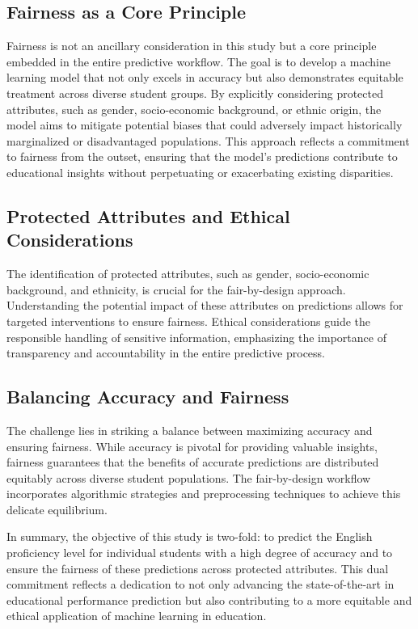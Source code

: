 \subsection{Fairness as a Core Principle}

Fairness is not an ancillary consideration in this study but a core principle embedded in the entire predictive workflow. The goal is to develop a machine learning model that not only excels in accuracy but also demonstrates equitable treatment across diverse student groups. By explicitly considering protected attributes, such as gender, socio-economic background, or ethnic origin, the model aims to mitigate potential biases that could adversely impact historically marginalized or disadvantaged populations. This approach reflects a commitment to fairness from the outset, ensuring that the model's predictions contribute to educational insights without perpetuating or exacerbating existing disparities.

\subsection{Protected Attributes and Ethical Considerations}

The identification of protected attributes, such as gender, socio-economic background, and ethnicity, is crucial for the fair-by-design approach. Understanding the potential impact of these attributes on predictions allows for targeted interventions to ensure fairness. Ethical considerations guide the responsible handling of sensitive information, emphasizing the importance of transparency and accountability in the entire predictive process.

\subsection{Balancing Accuracy and Fairness}

The challenge lies in striking a balance between maximizing accuracy and ensuring fairness. While accuracy is pivotal for providing valuable insights, fairness guarantees that the benefits of accurate predictions are distributed equitably across diverse student populations. The fair-by-design workflow incorporates algorithmic strategies and preprocessing techniques to achieve this delicate equilibrium.

In summary, the objective of this study is two-fold: to predict the English proficiency level for individual students with a high degree of accuracy and to ensure the fairness of these predictions across protected attributes. This dual commitment reflects a dedication to not only advancing the state-of-the-art in educational performance prediction but also contributing to a more equitable and ethical application of machine learning in education.

